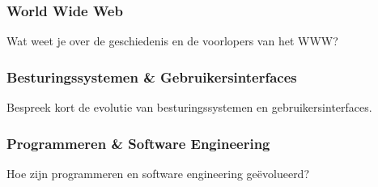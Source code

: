 \documentclass[../main.tex]{subfiles}
\begin{document}
\subsubsection{World Wide Web}
\begin{question}
Wat weet je over de geschiedenis en de voorlopers van het WWW?
\end{question}

\subsubsection{Besturingssystemen \& Gebruikersinterfaces}
\begin{question}
Bespreek kort de evolutie van besturingssystemen en gebruikersinterfaces.
\end{question}

\subsubsection{Programmeren \& Software Engineering}
\begin{question}
Hoe zijn programmeren en software engineering geëvolueerd?
\end{question}
\end{document}
